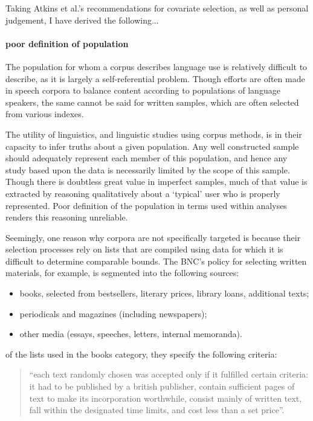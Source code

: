 Taking Atkins et al.'s recommendations for covariate selection, as well as personal judgement, I have derived the following...



\paragraph{ poor definition of population}
The population for whom a corpus describes language use is relatively difficult to describe, as it is largely a self-referential problem. Though efforts are often made in speech corpora to balance content according to populations of language speakers, the same cannot be said for written samples, which are often selected from various indexes.

The utility of linguistics, and linguistic studies using corpus methods, is in their capacity to infer truths about a given population. Any well constructed sample should adequately represent each member of this population, and hence any study based upon the data is necessarily limited by the scope of this sample. Though there is doubtless great value in imperfect samples, much of that value is extracted by reasoning qualitatively about a `typical' user who is properly represented. Poor definition of the population in terms used within analyses renders this reasoning unreliable.

Seemingly, one reason why corpora are not specifically targeted is because their selection processes rely on lists that are compiled using data for which it is difficult to determine comparable bounds.  The BNC's policy for selecting written materials, for example, is segmented into the following sources:

\begin{itemize}
 \item books, selected from bestsellers, literary prices, library loans, additional texts;
 \item periodicals and magazines (including newspapers);
 \item other media (essays, speeches, letters, internal memoranda).
\end{itemize}

of the lists used in the books category, they specify the following criteria:

\begin{quotation}
``each text randomly chosen was accepted only if it fulfilled certain criteria: it had to be published by a british publisher, contain sufficient pages of text to make its incorporation worthwhile, consist mainly of written text, fall within the designated time limits, and cost less than a set price''.
\end{quotation}

